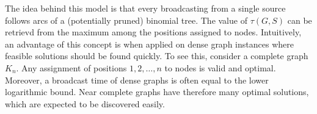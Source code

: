 The idea behind this model is that every broadcasting from a single source follows arcs of a (potentially pruned) binomial tree.
The value of $\tau(G,S)$ can be retrievd from the maximum among the positions assigned to nodes.
Intuitively, an advantage of this concept is when applied on dense graph instances where feasible solutions should be found quickly.
To see this, consider a complete graph $K_n$.
Any assignment of positions $1,2,\dots,n$ to nodes is valid and optimal. 
Moreover, a broadcast time of dense graphs is often equal to the lower logarithmic bound.
Near complete graphs have therefore many optimal solutions, which are expected to be discovered easily.

